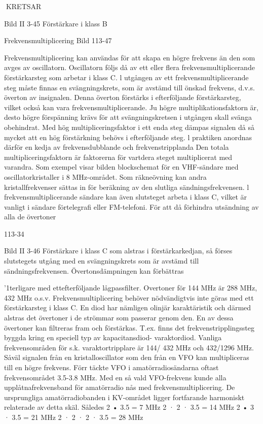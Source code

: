 {{{KRETSAR

Bild II 3-45 Förstärkare i klass B

Frekvensmultiplicering
Bild 113-47

Frekvensmultiplicering kan användas för att
skapa en högre frekvens än den som avges
av oscillatorn. Oscillatorn följs då av ett eller
flera frekvensmultiplicerande förstärkarsteg
som arbetar i klass C.
l utgången av ett frekvensmultiplicerande steg måste finnas en svängningskrets,
som är avstämd till önskad frekvens, d.v.s.
överton av insignalen. Denna överton förstärks i efterföljande förstärkarsteg, vilket
också kan vara frekvensmultiplicerande.
Ju högre multiplikationsfaktorn är, desto
högre förspänning krävs för att svängningskretsen i utgången skall svänga obehindrat.
Med hög multipliceringsfaktor i ett enda steg
dämpas signalen då så mycket att en hög
förstärkning behövs i efterföljande steg. l
praktiken anordnas därför en kedja av frekvensdubblande och frekvenstripplanda
Den totala multipliceringsfaktorn är faktorerna för vartdera steget multiplicerat med varandra.
Som exempel visar bilden blockschemat
för en VHF-sändare med oscillatorkristaller i
8 MHz-området. Som räkneövning kan andra kristallfrekvenser sättas in för beräkning
av den slutliga sändningsfrekvensen. l frekvensmultiplicerande sändare kan även slutsteget arbeta i klass C, vilket är vanligt i
sändare förtelegrafi eller FM-telefoni. För att
då förhindra utsändning av alla de övertoner

113-34

Bild II 3-46 Förstärkare i klass C
som alstras i förstärkarkedjan, så förses
slutstegets utgång med en svängningskrets
som är avstämd till sändningsfrekvensen.
Övertonsdämpningen kan förbättras }'1terligare med ettefterföljande lågpassfilter. Overtoner för 144 MHz är 288 MHz, 432 MHz
o.s.v.
Frekvensmultiplicering behöver nödvändigtvis inte göras med ett förstärkarsteg i
klass C. En diod har nämligen olinjär karaktäristik och därmed alstras det övertoner i de
strömmar som passerar genom den. En av
dessa övertoner kan filtreras fram och förstärkas. T.ex. finns det frekvenstripplingssteg byggda kring en speciell typ av kapacitansdiod- varaktordiod. Vanliga frekvensområden för s.k. varaktortripplare är 144/
432 MHz och 432/1296 MHz.
Såväl signalen från en kristalloscillator
som den från en VFO kan multipliceras till en
högre frekvens.
Förr täckte VFO i amatörradiosändarna
oftast frekvensområdet 3.5-3.8 MHz. Med
en så vald VFO-frekvens kunde alla upplåtnafrekvensband för amatörradio nås med
frekvensmultiplicering. De ursprungliga amatörradiobanden i KV-området ligger fortfarande harmoniskt relaterade av detta skäl.
Således
2 • 3.5 = 7 MHz
2 · 2 · 3.5 = 14 MHz
2 • 3 · 3.5 = 21 MHz
2 · 2 · 2 · 3.5 = 28 MHz

}}
